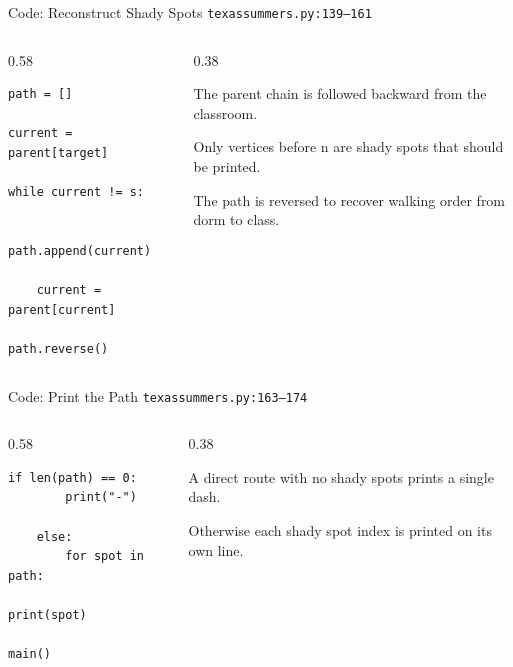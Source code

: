 \documentclass[aspectratio=169,11pt]{beamer}
\begin{document}
\begin{frame}[fragile]{Code: Reconstruct Shady Spots}
\scriptsize
{} \texttt{texassummers.py:139--161}

\vspace{0.08cm}
\begin{columns}[T,totalwidth=\textwidth]
\begin{column}{0.58\textwidth}
\begin{lstlisting}[style=cpcode]
path = []

current = parent[target]

while current != s:

    path.append(current)

    current = parent[current]

path.reverse()
\end{lstlisting}
\end{column}
\begin{column}{0.38\textwidth}
\begin{tightitemize}
  \item The parent chain is followed backward from the classroom.
  \item Only vertices before n are shady spots that should be printed.
  \item The path is reversed to recover walking order from dorm to class.
\end{tightitemize}
\end{column}
\end{columns}
\end{frame}

\begin{frame}[fragile]{Code: Print the Path}
\scriptsize
{} \texttt{texassummers.py:163--174}

\vspace{0.08cm}
\begin{columns}[T,totalwidth=\textwidth]
\begin{column}{0.58\textwidth}
\begin{lstlisting}[style=cpcode]
    if len(path) == 0:
        print("-")

    else:
        for spot in path:
            print(spot)

main()
\end{lstlisting}
\end{column}
\begin{column}{0.38\textwidth}
\begin{tightitemize}
  \item A direct route with no shady spots prints a single dash.
  \item Otherwise each shady spot index is printed on its own line.
\end{tightitemize}
\end{column}
\end{columns}
\end{frame}
\end{document}
